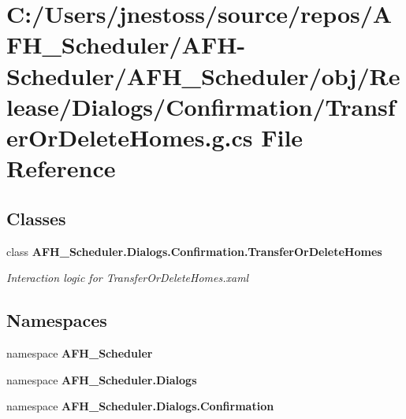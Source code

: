 \section{C\+:/\+Users/jnestoss/source/repos/\+A\+F\+H\+\_\+\+Scheduler/\+A\+F\+H-\/\+Scheduler/\+A\+F\+H\+\_\+\+Scheduler/obj/\+Release/\+Dialogs/\+Confirmation/\+Transfer\+Or\+Delete\+Homes.g.\+cs File Reference}
\label{_release_2_dialogs_2_confirmation_2_transfer_or_delete_homes_8g_8cs}
\subsection*{Classes}
\begin{DoxyCompactItemize}
\item 
class \textbf{ A\+F\+H\+\_\+\+Scheduler.\+Dialogs.\+Confirmation.\+Transfer\+Or\+Delete\+Homes}
\begin{DoxyCompactList}\small\item\em Interaction logic for Transfer\+Or\+Delete\+Homes.\+xaml \end{DoxyCompactList}\end{DoxyCompactItemize}
\subsection*{Namespaces}
\begin{DoxyCompactItemize}
\item 
namespace \textbf{ A\+F\+H\+\_\+\+Scheduler}
\item 
namespace \textbf{ A\+F\+H\+\_\+\+Scheduler.\+Dialogs}
\item 
namespace \textbf{ A\+F\+H\+\_\+\+Scheduler.\+Dialogs.\+Confirmation}
\end{DoxyCompactItemize}
